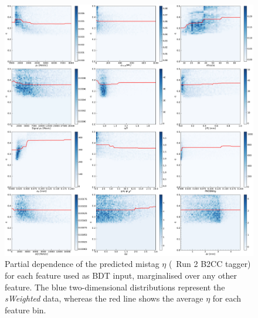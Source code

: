 \begin{figure}[t]
        \centering
        \includegraphics[width=\textwidth]{04FlavourTagging/figs/OSelectronOpt/2017-12-12-vibattis-OSElectron-bdt-calibration-sWeights_Run2/PartialDependence_RunIIcuts.pdf}
        \vspace{-2mm}
        \caption{Partial dependence of the predicted mistag $\eta$ (\OSe~Run 2 B2CC tagger) for each feature used as BDT input, marginalised over any other feature. The blue two-dimensional distributions represent the \emph{sWeighted} data, whereas the red line shows the average $\eta$ for each feature bin.}
        \label{fig:OSepartialdependenceRunIIB2CC}
\end{figure}

